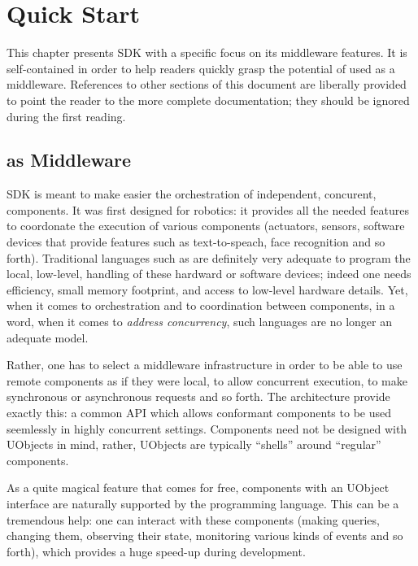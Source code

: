 \newenvironment{todo}{%
  \begin{quote}\itshape%
  }{%
  \end{quote}%
}

\chapter{Quick Start}
\label{sec:uob:quick}

This chapter presents \urbi SDK with a specific focus on its
middleware features.  It is self-contained in order to help readers
quickly grasp the potential of \urbi used as a middleware.  References
to other sections of this document are liberally provided to point the
reader to the more complete documentation; they should be ignored
during the first reading.

\section{\urbi as Middleware}

\urbi SDK is meant to make easier the orchestration of independent,
concurent, components.  It was first designed for robotics: it
provides all the needed features to coordonate the execution of
various components (actuators, sensors, software devices that provide
features such as text-to-speach, face recognition and so forth).
Traditional languages such as \Cxx are definitely very adequate to
program the local, low-level, handling of these hardward or software
devices; indeed one needs efficiency, small memory footprint, and
access to low-level hardware details.  Yet, when it comes to
orchestration and to coordination between components, in a word, when
it comes to \emph{address concurrency}, such languages are no longer
an adequate model.

Rather, one has to select a middleware infrastructure in order to be
able to use remote components as if they were local, to allow
concurrent execution, to make synchronous or asynchronous requests and
so forth.  The  architecture provide exactly this: a
common API which allows conformant components to be used seemlessly in
highly concurrent settings.  Components need not be designed with
UObjects in mind, rather, UObjects are typically ``shells'' around
``regular'' components.

As a quite magical feature that comes for free, components with an
UObject interface are naturally supported by the \us programming
language.  This can be a tremendous help: one can interact with these
components (making queries, changing them, observing their state,
monitoring various kinds of events and so forth), which provides a
huge speed-up during development.

